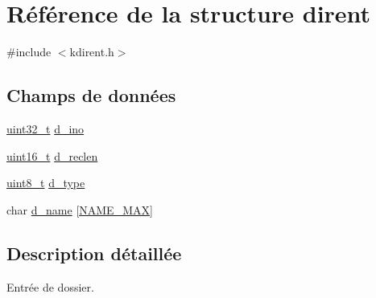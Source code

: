 \hypertarget{structdirent}{\section{Référence de la structure dirent}
\label{structdirent}
}


{\ttfamily \#include $<$kdirent.\-h$>$}

\subsection*{Champs de données}
\begin{DoxyCompactItemize}
\item 
\hyperlink{types_8h_a33594304e786b158f3fb30289278f5af}{uint32\-\_\-t} \hyperlink{structdirent_a0ed2e5ea3c71500f628914bf3966e4ba}{d\-\_\-ino}
\item 
\hyperlink{types_8h_adf4d876453337156dde61095e1f20223}{uint16\-\_\-t} \hyperlink{structdirent_a7cc67dd4ba5a8bed7f107f249957688d}{d\-\_\-reclen}
\item 
\hyperlink{types_8h_aba7bc1797add20fe3efdf37ced1182c5}{uint8\-\_\-t} \hyperlink{structdirent_a948760e3b7f607213a19f85e7af15a32}{d\-\_\-type}
\item 
char \hyperlink{structdirent_a7b4cbd53dc600257b2746225c8a8f3be}{d\-\_\-name} \mbox{[}\hyperlink{kdirent_8h_ac64541bdd81c961304b9babef1402640}{N\-A\-M\-E\-\_\-\-M\-A\-X}\mbox{]}
\end{DoxyCompactItemize}


\subsection{Description détaillée}
Entrée de dossier. 


